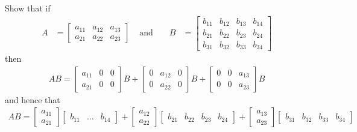 \documentclass[12pt]{article}
\newenvironment{problem}[2][Problem]{\begin{trivlist} \item[\hskip \labelsep {\bfseries #1}\hskip \labelsep {\bfseries #2.}]}{\end{trivlist}}
\begin{document}
    \begin{problem}{1.10}
      Show that if
    \begin{align*}
      A &= \begin{bmatrix} a_{11} & a_{12} & a_{13} \\  a_{21} & a_{22} & a_{23} \end{bmatrix} &\text{ and }&  &B &= \begin{bmatrix} b_{11} & b_{12} & b_{13} & b_{14} \\ b_{21} & b_{22} & b_{23} & b_{24} \\ b_{31} & b_{32} & b_{33} & b_{34} \end{bmatrix}
    \end{align*}
    then 
    \begin{align*}
      AB = \begin{bmatrix} a_{11} & 0 & 0\\ a_{21} & 0 & 0 \end{bmatrix} B +
       \begin{bmatrix} 0 & a_{12} & 0 \\ 0 & a_{22} & 0  \end{bmatrix} B +
       \begin{bmatrix} 0 & 0 & a_{13} \\ 0 & 0 & a_{23}\end{bmatrix} B 
    \end{align*}
    and hence that
    \begin{align*} 
      AB = \begin{bmatrix} a_{11}\\ a_{21}\end{bmatrix} \begin{bmatrix} b_{11} & \dots & b_{14} \end{bmatrix}  +
      \begin{bmatrix} a_{12} \\  a_{22}  \end{bmatrix} \begin{bmatrix} b_{21} & b_{22} & b_{23} & b_{24} \end{bmatrix} +
      \begin{bmatrix} a_{13} \\ a_{23}\end{bmatrix} \begin{bmatrix} b_{31} & b_{32} & b_{33} & b_{34} \end{bmatrix}
    \end{align*}
    \end{problem}
\end{document}
